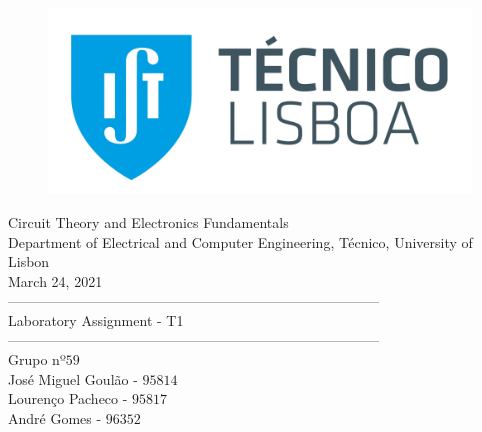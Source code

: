\thispagestyle {empty}


\begin{figure}[h]
	\centering
	\includegraphics[width = 0.5\linewidth]{ist_foto}
\end{figure}


\begin{center}

\vspace{2cm}
{\FontLb Circuit Theory and Electronics Fundamentals} \\

\vspace{0.5cm}
{\FontSn Department of Electrical and Computer Engineering, Técnico, University of Lisbon} \\

\vspace{0.5cm}
{\FontSn March 24, 2021} \\

\vspace{1cm}
{\FontSn --------------------------------------------------------------------------------} \\
\vspace{0.1cm}
{\FontLb Laboratory Assignment - T1} \\
{\FontSn --------------------------------------------------------------------------------} \\

\vspace{1cm}
{\FontSn Grupo nº$59$} \\
\vspace{0.25cm}
{\FontSn José Miguel Goulão - $95814$} \\
{\FontSn Lourenço Pacheco - $95817$} \\
{\FontSn André Gomes - $96352$} \\

\vspace{1cm}

\end{center}


